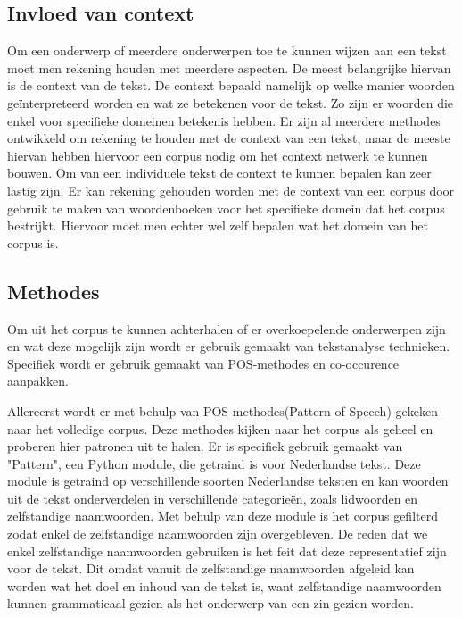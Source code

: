 \subsection{Invloed van context}
Om een onderwerp of meerdere onderwerpen toe te kunnen wijzen aan een tekst moet men rekening houden met meerdere aspecten. De meest belangrijke hiervan is de context van de tekst. De context bepaald namelijk op welke manier woorden geïnterpreteerd worden en wat ze betekenen voor de tekst. Zo zijn er woorden die enkel voor specifieke domeinen betekenis hebben. Er zijn al meerdere methodes ontwikkeld om rekening te houden met de context van een tekst, maar de meeste hiervan hebben hiervoor een corpus nodig om het context netwerk te kunnen bouwen. Om van een individuele tekst de context te kunnen bepalen kan zeer lastig zijn. Er kan rekening gehouden worden met de context van een corpus door gebruik te maken van woordenboeken voor het specifieke domein dat het corpus bestrijkt. Hiervoor moet men echter wel zelf bepalen wat het domein van het corpus is. \citep{aggarwal2012survey}

\pagebreak
\subsection{Methodes}
Om uit het corpus te kunnen achterhalen of er overkoepelende onderwerpen zijn en wat deze mogelijk zijn wordt er gebruik gemaakt van tekstanalyse technieken. Specifiek wordt er gebruik gemaakt van POS-methodes en co-occurence aanpakken.~\cite{callon1991co}  

Allereerst wordt er met behulp van POS-methodes(Pattern of Speech) gekeken naar het volledige corpus. Deze methodes kijken naar het corpus als geheel en proberen hier patronen uit te halen. Er is specifiek gebruik gemaakt van "Pattern", een Python module, die getraind is voor Nederlandse tekst. Deze module is getraind op verschillende soorten Nederlandse teksten en kan woorden uit de tekst onderverdelen in verschillende categorieën, zoals lidwoorden en zelfstandige naamwoorden. Met behulp van deze module is het corpus gefilterd zodat enkel de zelfstandige naamwoorden zijn overgebleven. De reden dat we enkel zelfstandige naamwoorden gebruiken is het feit dat deze representatief zijn voor de tekst. Dit omdat vanuit de zelfstandige naamwoorden afgeleid kan worden wat het doel en inhoud van de tekst is, want zelfstandige naamwoorden kunnen grammaticaal gezien als het onderwerp van een zin gezien worden. 


